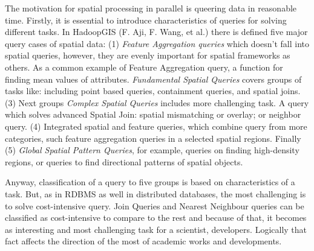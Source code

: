 \documentclass[a4paper,12pt,oneside]{report}
\begin{document}
The motivation for spatial processing in parallel is queering data in reasonable time. 
Firstly, it is essential to introduce characteristics of queries for solving different 
tasks. In HadoopGIS (F. Aji, F. Wang, et al.\cite{hadoopGIS}) there is defined five major 
query cases of spatial data: (1) \textit{Feature Aggregation queries}  which doesn’t 
fall into spatial queries, however, they are evenly important for spatial frameworks 
as others. As a common example of Feature Aggregation query, a function for finding mean 
values of attributes. 
\textit{Fundamental Spatial Queries} covers groups of tasks like: including point based 
queries, containment queries, and spatial joins. (3) Next groups 
\textit{ Complex Spatial Queries} includes more challenging task. A query which solves 
advanced Spatial Join: spatial mismatching or overlay; or neighbor query. (4) Integrated 
spatial and feature queries, which combine query from more categories, such feature 
aggregation queries in a selected spatial regions. Finally (5) \textit{Global
Spatial Pattern Queries}, for example, queries on finding high-density regions, or 
queries to find directional patterns of spatial objects.

Anyway, classification of a query to five groups is based on characteristics of a task. 
But, as in RDBMS as well in distributed databases, the most challenging is to solve  cost-intensive query. 
Join Queries and Nearest Neighbour queries can be classified as 
cost-intensive to compare to the rest and because of that, it becomes as interesting and
most challenging task for a scientist, developers. Logically that fact affects the direction of the most of academic works and developments.
\end{document}
